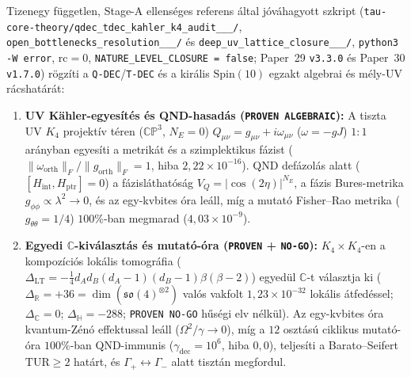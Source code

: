 \documentclass[11pt,a4paper]{article}
\begin{document}
Tizenegy független, Stage-A ellenséges referens által jóváhagyott szkript (\texttt{tau-core-theory/\allowbreak qdec\_\allowbreak tdec\_\allowbreak kahler\_\allowbreak k4\_\allowbreak audit\_\_\_/}, \texttt{open\_\allowbreak bottlenecks\_\allowbreak resolution\_\_\_/} és \texttt{deep\_\allowbreak uv\_\allowbreak lattice\_\allowbreak closure\_\_\_/}, \texttt{python3 -W error}, $\mathrm{rc}=0$, \texttt{NATURE\_\allowbreak LEVEL\_\allowbreak CLOSURE = false}; Paper~29 \texttt{v3.3.0} és Paper~30 \texttt{v1.7.0}) rögzíti a \texttt{Q-DEC}/\texttt{T-DEC} és a királis $\mathrm{Spin}(10)$ egzakt algebrai és mély-UV rácshatárát:
\begin{enumerate}\setlength{\itemsep}{2pt}
\item \textbf{UV K\"ahler-egyesítés és QND-hasadás (\texttt{PROVEN ALGEBRAIC}):} A tiszta UV $K_4$ projektív téren ($\mathbb{CP}^3$, $N_E=0$) $Q_{\mu\nu}=g_{\mu\nu}+i\omega_{\mu\nu}$ ($\omega=-gJ$) $1:1$ arányban egyesíti a metrikát és a szimplektikus fázist ($\|\omega_{\mathrm{orth}}\|_F/\|g_{\mathrm{orth}}\|_F=1$, hiba $2{,}22\times 10^{-16}$). QND defázolás alatt ($[H_{\mathrm{int}},H_{\mathrm{ptr}}]=0$) a fázisláthatóság $V_Q=|\cos(2\eta)|^{N_E}$, a fázis Bures-metrika $g_{\phi\phi}\propto\lambda^2\to 0$, és az egy-kvbites óra leáll, míg a mutató Fisher--Rao metrika ($g_{\theta\theta}=1/4$) $100\%$-ban megmarad ($4{,}03\times 10^{-9}$).
\item \textbf{Egyedi $\mathbb{C}$-kiválasztás és mutató-óra (\texttt{PROVEN} + \texttt{NO-GO}):} $K_4\times K_4$-en a kompozíciós lokális tomográfia ($\Delta_{\mathrm{LT}}=-\frac{1}{4}d_A d_B(d_A-1)(d_B-1)\beta(\beta-2)$) egyedül $\mathbb{C}$-t választja ki ($\Delta_{\mathbb{R}}=+36=\dim(\mathfrak{so}(4)^{\otimes 2})$ valós vakfolt $1{,}23\times 10^{-32}$ lokális átfedéssel; $\Delta_{\mathbb{C}}=0$; $\Delta_{\mathbb{H}}=-288$; \texttt{PROVEN NO-GO} hűségi elv nélkül). Az egy-kvbites óra kvantum-Zénó effektussal leáll ($\Omega^2/\gamma\to 0$), míg a $12$ osztású ciklikus mutató-óra $100\%$-ban QND-immunis ($\gamma_{\mathrm{dec}}=10^6$, hiba $0{,}0$), teljesíti a Barato--Seifert $\mathrm{TUR}\ge 2$ határt, és $\Gamma_+\leftrightarrow\Gamma_-$ alatt tisztán megfordul.

\end{enumerate}
\end{document}
